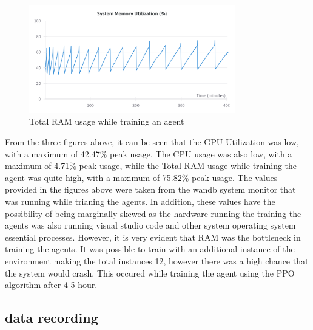 \begin{figure}[H]
    \centering
    \includegraphics[width=0.8\textwidth]{figures/System_RAM_Utilization.png}
    \caption{Total RAM usage while training an agent}
    \label{fig:sys_memory_useage}
\end{figure}

From the three figures above, it can be seen that the GPU Utilization was low, with a maximum of 42.47\% peak usage. The CPU usage was also low, with a maximum of 4.71\% peak usage, while the Total RAM usage while training the agent was quite high, with a maximum of 75.82\% peak usage. The values provided in the figures above were taken from the wandb system monitor that was running while trianing the agents. In addition, these values have the possibility of being marginally skewed as the hardware running the training the agents was also running visual studio code and other system operating system essential processes. However, it is very evident that RAM was the bottleneck in training the agents. It was possible to train with an additional instance of the environment making the total instances 12, however there was a high chance that the system would crash. This occured while training the agent using the PPO algorithm after 4-5 hour. 

\subsection{data recording}

